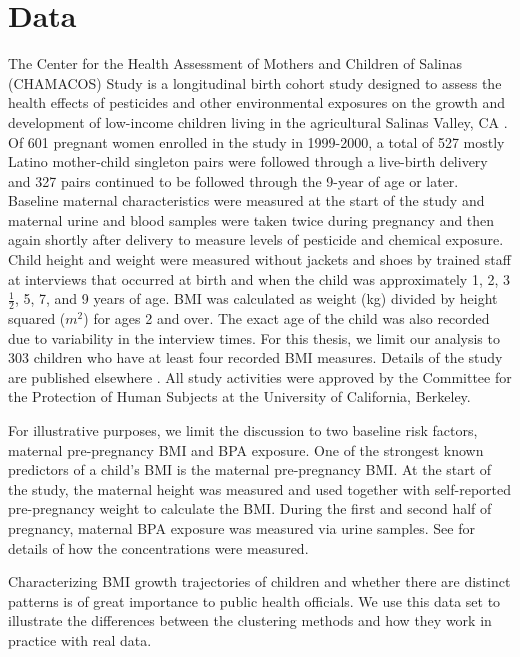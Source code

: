 \section{Data}
The Center for the Health Assessment of Mothers and Children of Salinas (CHAMACOS) Study is a longitudinal birth cohort study designed to assess the health effects of pesticides and other environmental exposures on the growth and development of low-income children living in the agricultural Salinas Valley, CA \cite{eskenazi2004,eskenazi2005}. Of 601 pregnant women enrolled in the study in 1999-2000, a total of 527 mostly Latino mother-child singleton pairs were followed through a live-birth delivery and 327 pairs continued to be followed through the 9-year of age or later. Baseline maternal characteristics were measured at the start of the study and maternal urine and blood samples were taken twice during pregnancy and then again shortly after delivery to measure levels of pesticide and chemical exposure. Child height and weight were measured without jackets and shoes by trained staff at interviews that occurred at birth and when the child was approximately 1, 2, 3 $\frac{1}{2}$, 5, 7, and 9 years of age. BMI was calculated as weight (kg) divided by height squared ($m^{2}$) for ages 2 and over. The exact age of the child was also recorded due to variability in the interview times. For this thesis, we limit our analysis to 303 children who have at least four recorded BMI measures. Details of the study are published elsewhere \cite{eskenazi2003}. All study activities were approved by the Committee for the Protection of Human Subjects at the University of California, Berkeley. 

For illustrative purposes, we limit the discussion to two baseline risk factors, maternal pre-pregnancy BMI and BPA exposure. One of the strongest known predictors of a child's BMI is the maternal pre-pregnancy BMI. At the start of the study, the maternal height was measured and used together with self-reported pre-pregnancy weight to calculate the BMI. During the first and second half of pregnancy, maternal BPA exposure was measured via urine samples. See \textcite{harley2013} for details of how the concentrations were measured.

Characterizing BMI growth trajectories of children and whether there are distinct patterns is of great importance to public health officials. We use this data set to illustrate the differences between the clustering methods and how they work in practice with real data.

